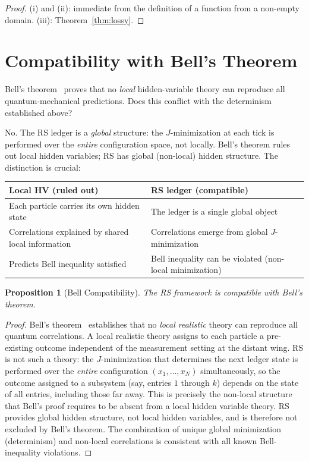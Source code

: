 \documentclass[12pt,a4paper]{article}
\newtheorem{proposition}[theorem]{Proposition}
\theoremstyle{definition}
\theoremstyle{remark}
\begin{document}
\begin{proof}
(i) and (ii): immediate from the definition of a function from a
non-empty domain.  (iii): Theorem~\ref{thm:lossy}.
\end{proof}

\section{Compatibility with Bell's Theorem}
\label{sec:bell}

Bell's theorem~\cite{Bell1964} proves that no \emph{local}
hidden-variable theory can reproduce all quantum-mechanical predictions.
Does this conflict with the determinism established above?

No.  The RS ledger is a \emph{global} structure: the $J$-minimization at
each tick is performed over the \emph{entire} configuration space, not
locally.  Bell's theorem rules out local hidden variables; RS has global
(non-local) hidden structure.  The distinction is crucial:

\begin{center}
\renewcommand{\arraystretch}{1.3}
\begin{tabular}{@{}p{5cm}p{5cm}@{}}
\toprule
\textbf{Local HV (ruled out)} & \textbf{RS ledger (compatible)} \\
\midrule
Each particle carries its own hidden state & The ledger is a single global object \\
Correlations explained by shared local information & Correlations emerge from global $J$-minimization \\
Predicts Bell inequality satisfied & Bell inequality can be violated (non-local minimization) \\
\bottomrule
\end{tabular}
\end{center}

\begin{proposition}[Bell Compatibility]
\label{prop:bell}
The RS framework is compatible with Bell's theorem.
\end{proposition}

\begin{proof}
Bell's theorem~\cite{Bell1964} establishes that no \emph{local realistic}
theory can reproduce all quantum correlations.  A local realistic theory
assigns to each particle a pre-existing outcome independent of the
measurement setting at the distant wing.  RS is not such a theory: the
$J$-minimization that determines the next ledger state is performed over
the \emph{entire} configuration $(x_1,\ldots,x_N)$ simultaneously, so
the outcome assigned to a subsystem (say, entries $1$ through $k$)
depends on the state of all entries, including those far away.  This is
precisely the non-local structure that Bell's proof requires to be absent
from a local hidden variable theory.  RS provides global hidden structure,
not local hidden variables, and is therefore not excluded by Bell's
theorem.  The combination of unique global minimization (determinism) and
non-local correlations is consistent with all known Bell-inequality
violations.
\end{proof}
\end{document}

